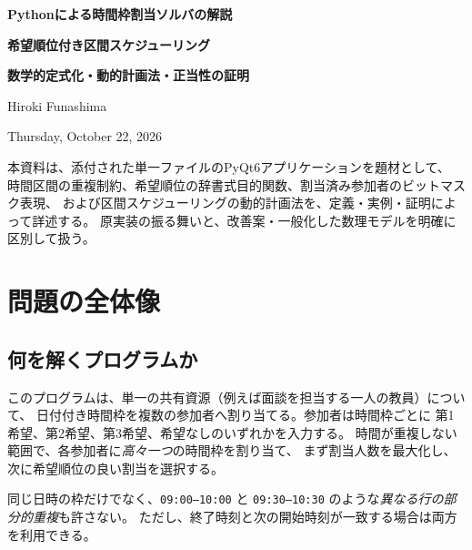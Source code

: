 \documentclass[11pt,a4paper]{ltjsarticle}
\theoremstyle{definition}
\theoremstyle{remark}
\begin{document}
\begin{titlepage}
\centering
\vspace*{36mm}
{\Large\color{DeepBlue}\bfseries Pythonによる時間枠割当ソルバの解説\par}
\vspace{10mm}
{\huge\bfseries 希望順位付き区間スケジューリング\par}
\vspace{4mm}
{\Large\bfseries 数学的定式化・動的計画法・正当性の証明\par}
\vspace{8mm}
{\large Hiroki Funashima\par}
\vspace{8mm}
{\large Thursday, October 22, 2026\par}
\vfill
\begin{minipage}{0.83\textwidth}
\small
本資料は、添付された単一ファイルのPyQt6アプリケーションを題材として、
時間区間の重複制約、希望順位の辞書式目的関数、割当済み参加者のビットマスク表現、
および区間スケジューリングの動的計画法を、定義・実例・証明によって詳述する。
原実装の振る舞いと、改善案・一般化した数理モデルを明確に区別して扱う。
\end{minipage}\par
\end{titlepage}
\tableofcontents
\clearpage

\section{問題の全体像}
\subsection{何を解くプログラムか}
このプログラムは、単一の共有資源（例えば面談を担当する一人の教員）について、
日付付き時間枠を複数の参加者へ割り当てる。参加者は時間枠ごとに
第1希望、第2希望、第3希望、希望なしのいずれかを入力する。
時間が重複しない範囲で、各参加者に\emph{高々一つ}の時間枠を割り当て、
まず割当人数を最大化し、次に希望順位の良い割当を選択する。

同じ日時の枠だけでなく、\texttt{09:00--10:00} と
\texttt{09:30--10:30} のような\emph{異なる行の部分的重複}も許さない。
ただし、終了時刻と次の開始時刻が一致する場合は両方を利用できる。
\end{document}
